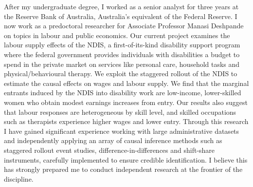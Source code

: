  After my undergraduate degree, I worked as a senior analyst for three years at the Reserve Bank of Australia, Australia's equivalent of the Federal Reserve. I now work as a predoctoral researcher for Associate Professor Manasi Deshpande on topics in labour and public economics. Our current project examines the labour supply effects of the NDIS, a first-of-its-kind disability support program where the federal government provides individuals with disabilities a budget to spend in the private market on services like personal care, household tasks and physical/behavioural therapy. We exploit the staggered rollout of the NDIS to estimate the causal effects on wages and labour supply. We find that the marginal entrants induced by the NDIS into disability work are low-income, lower-skilled women who obtain modest earnings increases from entry. Our results also suggest that labour responses are heterogeneous by skill level, and skilled occupations such as therapists experience higher wages and lower entry. Through this research I have gained significant experience working with large administrative datasets and independently applying an array of causal inference methods such as staggered rollout event studies, difference-in-differences and shift-share instruments, carefully implemented to ensure credible identification. I believe this has strongly prepared me to conduct independent research at the frontier of the discipline.

